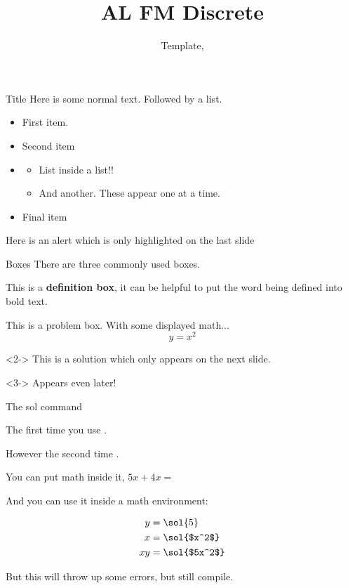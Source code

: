 \documentclass[8pt]{beamer}  %
\title{{\color{aa}\Huge\adfbullet{9}}AL FM Discrete} %
\subtitle{Template, \textattachfile{Template.tex}{(TeX)}} %
\begin{document}
\frame{\titlepage} %

\setlength{\abovedisplayskip}{0pt}
\setlength{\belowdisplayskip}{0pt}
\setlength{\abovedisplayshortskip}{0pt}
\setlength{\belowdisplayshortskip}{0pt}  %

\begin{frame}{Title}   %
    Here is some normal text. Followed by a list.
\begin{itemize}
	\item First item.
	\item Second item
    \item \begin{itemize}
            \item<+-> List inside a list!!
            \item<+-> And another. These appear one at a time.
        \end{itemize} 
    \item Final item
\end{itemize}

\alert<+->{Here is an alert which is only highlighted on the last slide}

\end{frame}

\begin{frame}{Boxes}
	There are three commonly used boxes.
	
	\begin{definition}
	This is a \textbf{definition box}, it can be helpful to put the word being defined into bold text.
	\end{definition}
	
	\begin{problem}
	        This is a problem box. With some displayed math...
	        \[y=x^2\]
	\end{problem}
	
	\begin{solution}<2->
	This is a solution which only appears on the next slide.
	\end{solution}
	
	\begin{solution}<3->
	Appears even later!
	\end{solution}

\end{frame}

\begin{frame}{The sol command}

The first time you use .

However the second time .

You can put math inside it, $5x+4x=$ 

And you can use it inside a math environment:

\begin{align*}
    y &= \sol{5} \\
    x &= \sol{$x^2$} \\
    xy &= \sol{$5x^2$}
\end{align*}

But this will throw up some errors, but still compile.

\end{frame}
\end{document}
